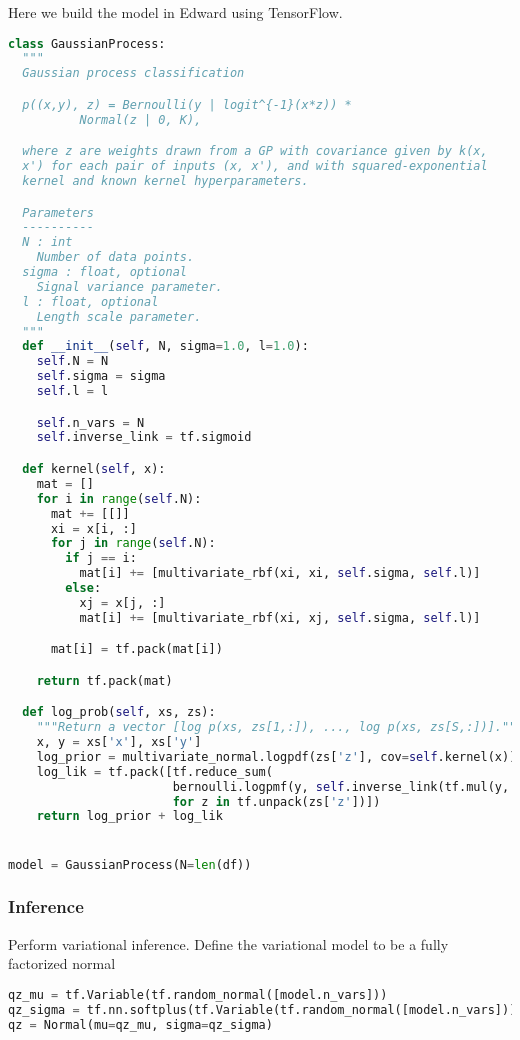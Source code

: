 Here we build the model in Edward using TensorFlow.
\begin{lstlisting}[language=Python]
class GaussianProcess:
  """
  Gaussian process classification

  p((x,y), z) = Bernoulli(y | logit^{-1}(x*z)) *
          Normal(z | 0, K),

  where z are weights drawn from a GP with covariance given by k(x,
  x') for each pair of inputs (x, x'), and with squared-exponential
  kernel and known kernel hyperparameters.

  Parameters
  ----------
  N : int
    Number of data points.
  sigma : float, optional
    Signal variance parameter.
  l : float, optional
    Length scale parameter.
  """
  def __init__(self, N, sigma=1.0, l=1.0):
    self.N = N
    self.sigma = sigma
    self.l = l

    self.n_vars = N
    self.inverse_link = tf.sigmoid

  def kernel(self, x):
    mat = []
    for i in range(self.N):
      mat += [[]]
      xi = x[i, :]
      for j in range(self.N):
        if j == i:
          mat[i] += [multivariate_rbf(xi, xi, self.sigma, self.l)]
        else:
          xj = x[j, :]
          mat[i] += [multivariate_rbf(xi, xj, self.sigma, self.l)]

      mat[i] = tf.pack(mat[i])

    return tf.pack(mat)

  def log_prob(self, xs, zs):
    """Return a vector [log p(xs, zs[1,:]), ..., log p(xs, zs[S,:])]."""
    x, y = xs['x'], xs['y']
    log_prior = multivariate_normal.logpdf(zs['z'], cov=self.kernel(x))
    log_lik = tf.pack([tf.reduce_sum(
                       bernoulli.logpmf(y, self.inverse_link(tf.mul(y, z))))
                       for z in tf.unpack(zs['z'])])
    return log_prior + log_lik


model = GaussianProcess(N=len(df))
\end{lstlisting}


\subsubsection{Inference}

Perform variational inference.
Define the variational model to be a fully factorized normal
\begin{lstlisting}[language=Python]
qz_mu = tf.Variable(tf.random_normal([model.n_vars]))
qz_sigma = tf.nn.softplus(tf.Variable(tf.random_normal([model.n_vars])))
qz = Normal(mu=qz_mu, sigma=qz_sigma)
\end{lstlisting}

